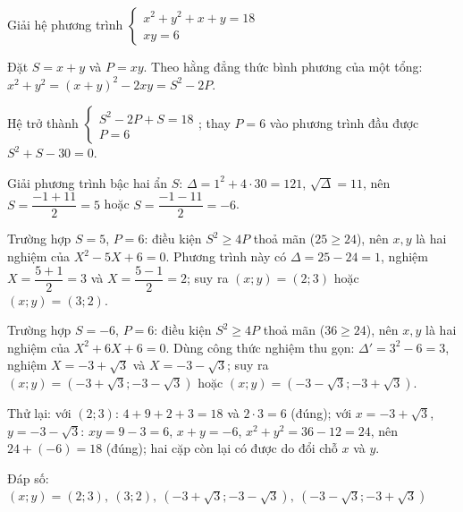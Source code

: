 \begin{problem}[9DS-PT2-029]
Giải hệ phương trình $\begin{cases} x^2 + y^2 + x + y = 18 \\ xy = 6 \end{cases}$

\begin{solution}
Đặt $S = x + y$ và $P = xy$. Theo hằng đẳng thức bình phương của một tổng: $x^2 + y^2 = (x + y)^2 - 2xy = S^2 - 2P$.

Hệ trở thành $\begin{cases} S^2 - 2P + S = 18 \\ P = 6 \end{cases}$; thay $P = 6$ vào phương trình đầu được $S^2 + S - 30 = 0$.

Giải phương trình bậc hai ẩn $S$: $\Delta = 1^2 + 4 \cdot 30 = 121$, $\sqrt{\Delta} = 11$, nên $S = \dfrac{-1 + 11}{2} = 5$ hoặc $S = \dfrac{-1 - 11}{2} = -6$.

Trường hợp $S = 5$, $P = 6$: điều kiện $S^2 \geq 4P$ thoả mãn ($25 \geq 24$), nên $x, y$ là hai nghiệm của $X^2 - 5X + 6 = 0$. Phương trình này có $\Delta = 25 - 24 = 1$, nghiệm $X = \dfrac{5 + 1}{2} = 3$ và $X = \dfrac{5 - 1}{2} = 2$; suy ra $(x; y) = (2; 3)$ hoặc $(x; y) = (3; 2)$.

Trường hợp $S = -6$, $P = 6$: điều kiện $S^2 \geq 4P$ thoả mãn ($36 \geq 24$), nên $x, y$ là hai nghiệm của $X^2 + 6X + 6 = 0$. Dùng công thức nghiệm thu gọn: $\Delta' = 3^2 - 6 = 3$, nghiệm $X = -3 + \sqrt{3}$ và $X = -3 - \sqrt{3}$; suy ra $(x; y) = (-3 + \sqrt{3}; -3 - \sqrt{3})$ hoặc $(x; y) = (-3 - \sqrt{3}; -3 + \sqrt{3})$.

Thử lại: với $(2; 3)$: $4 + 9 + 2 + 3 = 18$ và $2 \cdot 3 = 6$ (đúng); với $x = -3 + \sqrt{3}$, $y = -3 - \sqrt{3}$: $xy = 9 - 3 = 6$, $x + y = -6$, $x^2 + y^2 = 36 - 12 = 24$, nên $24 + (-6) = 18$ (đúng); hai cặp còn lại có được do đổi chỗ $x$ và $y$.

Đáp số: $\boxed{(x; y) = (2; 3),\ (3; 2),\ (-3 + \sqrt{3}; -3 - \sqrt{3}),\ (-3 - \sqrt{3}; -3 + \sqrt{3})}$
\end{solution}
\end{problem}

